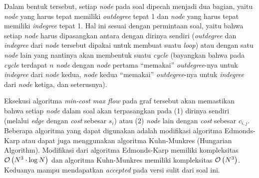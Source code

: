 \documentclass[../main_editorial.tex]{subfiles} %
\begin{document}
\begin{center}
\end{center}

Dalam bentuk tersebut, setiap \textit{node} pada soal dipecah menjadi dua bagian, yaitu \textit{node} yang harus tepat memiliki \textit{outdegree} tepat 1 dan \textit{node} yang harus tepat memiliki \textit{indegree} tepat 1. Hal ini sesuai dengan permintaan soal, yaitu bahwa setiap \textit{node} harus dipasangkan antara dengan dirinya sendiri (\textit{outdegree} dan \textit{indegree} dari \textit{node} tersebut dipakai untuk membuat suatu \textit{loop}) atau dengan satu \textit{node} lain yang nantinya akan membentuk suatu \textit{cycle} (bayangkan bahwa pada \textit{cycle} terdapat $ n $ \textit{node} dengan \textit{node} pertama ``memakai'' \textit{outdegree}-nya untuk \textit{indegree} dari \textit{node} kedua, \textit{node} kedua ``memakai'' \textit{outdegree}-nya untuk \textit{indegree} dari \textit{node} ketiga, dan seterusnya).

Eksekusi algoritma \textit{min-cost max flow} pada graf tersebut akan memastikan bahwa setiap \textit{node} dalam soal akan terpasangkan pada (1) dirinya sendiri (melalui \textit{edge} dengan \textit{cost} sebesar $ s_i $) atau (2) \textit{node} lain dengan \textit{cost} sebesar $ c_{i, j} $. Beberapa algoritma yang dapat digunakan adalah modifikasi algoritma Edmonds-Karp atau dapat juga menggunakan algoritma Kuhn-Munkres (Hungarian Algorithm). Modifikasi dari algoritma Edmonds-Karp memiliki kompleksitas $ \mathcal{O}\left( N^3\cdot \log{N} \right) $ dan algoritma Kuhn-Munkres memiliki kompleksitas $ \mathcal{O}\left( N^3 \right) $. Keduanya mampu mendapatkan \textit{accepted} pada versi sulit dari soal ini.
\end{document}
